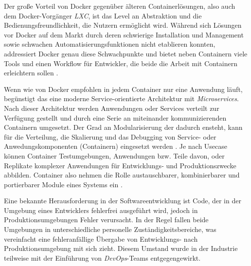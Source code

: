 \documentclass[../main.tex]{subfiles}
\begin{document}



    Der große Vorteil von Docker gegenüber älteren Containerlösungen, also auch dem Docker-Vorgänger \emph{LXC}, ist das Level an Abstraktion und die Bedienungsfreundlichkeit, die Nutzern ermöglicht wird. Während sich Lösungen vor Docker auf dem Markt durch deren schwierige Installation und Management sowie schwachen Automatisierungsfunktionen nicht etablieren konnten, addressiert Docker genau diese Schwachpunkte \cite[S.7]{dockerBook} und bietet neben Containern viele Tools und einen Workflow für Entwickler, die beide die Arbeit mit Containern erleichtern sollen \cite[S.1]{dockerIntroIEEE}.


    Wenn wie von Docker empfohlen in jedem Container nur eine Anwendung läuft, begünstigt das eine moderne Service-orientierte Architektur mit \emph{Microservices}. Nach dieser Architektur werden Anwendungen oder Services verteilt zur Verfügung gestellt und durch eine Serie an miteinander kommunizierenden Containern umgesetzt. Der Grad an Modularisierung der dadurch ensteht, kann für die Verteilung, die Skalierung und das Debugging von Service- oder Anwedungskomponenten (Containern) eingesetzt werden \cite[S.9]{dockerBook}. Je nach Usecase können Container Testumgebungen, Anwendungen bzw. Teile davon, oder Replikate komplexer Anwendungen für Entwicklungs- und Produktionszwecke abbilden. Container also nehmen die Rolle austauschbarer, kombinierbarer und portierbarer Module eines Systems ein \cite[S.12]{dockerBook}.

    Eine bekannte Herausforderung in der Softwareentwicklung ist Code, der in der Umgebung eines Entwicklers fehlerfrei ausgeführt wird, jedoch in Produktionsumgebungen Fehler verursacht. In der Regel fallen beide Umgebungen in unterschiedliche personelle Zuständigkeitsbereiche, was vereinfacht eine fehleranfällige Übergabe von Entwicklungs- nach Produktionsumgebung mit sich zieht. Diesem Umstand wurde in der Industrie teilweise mit der Einführung von \emph{\gls{DevOps}}-Teams entgegengewirkt.
\end{document}
